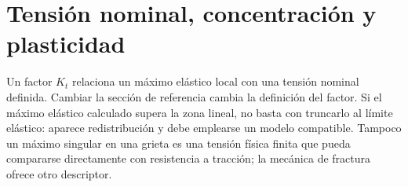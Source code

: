 \section{Tensión nominal, concentración y plasticidad}
Un factor $K_t$ relaciona un máximo elástico local con una tensión nominal definida. Cambiar la sección de referencia cambia la definición del factor. Si el máximo elástico calculado supera la zona lineal, no basta con truncarlo al límite elástico: aparece redistribución y debe emplearse un modelo compatible. Tampoco un máximo singular en una grieta es una tensión física finita que pueda compararse directamente con resistencia a tracción; la mecánica de fractura ofrece otro descriptor.
